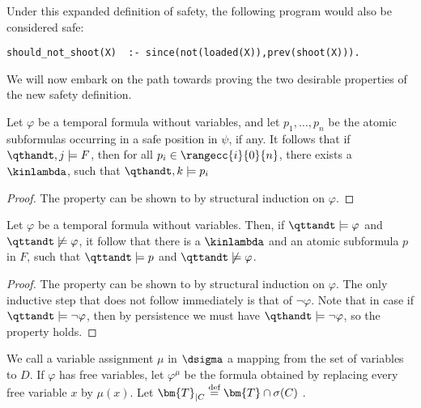 Under this expanded definition of safety, the following program would
also be considered safe:

\begin{center}
    \begin{lstlisting}[numbers=none]
should_not_shoot(X)  :- since(not(loaded(X)),prev(shoot(X))).
    \end{lstlisting}
\end{center}

We will now embark on the path towards proving the two desirable
properties of the new safety definition.

\begin{lemma}\label{lemma1}
  Let $\varphi$ be a temporal formula without variables, and let
  $p_1,\dots,p_n$ be the atomic subformulas occurring in a safe
  position in $\psi$, if any. It follows that if
  $\qthandt,j \models F$, then for all $p_i \in \rangecc{i}{0}{n}$,
  there exists a $\kinlambda$, such that $\qthandt,k \models p_i$
\end{lemma}
\begin{proof}
The property can be shown to by structural induction on $\varphi$.
\end{proof}

\begin{lemma}\label{lemma2}
  Let $\varphi$ be a temporal formula without variables. Then, if
  $\qttandt \models \varphi$ and $\qttandt \not\models \varphi$, it
  follow that there is a $\kinlambda$ and an atomic subformula $p$ in
  $F$, such that $\qttandt \models p$ and
  $\qttandt \not\models \varphi$.
\end{lemma}
\begin{proof}
  The property can be shown to by structural induction on
  $\varphi$. The only inductive step that does not follow immediately
  is that of $\neg \varphi$. Note that in case if
  $\qttandt \models \neg \varphi$, then by persistence we must have
  $\qthandt \models \neg \varphi$, so the property holds.
\end{proof}

We call a variable assignment $\mu$ in $\dsigma$ a mapping from the
set of variables to $D$. If $\varphi$ has free variables, let
$\varphi^\mu$ be the formula obtained by replacing every free variable
$x$ by $\mu(x)$. Let $\bm{T}_{|C} \defeq \bm{T}\cap \sigma(C)$
\cite{agcapevidi17a}.

